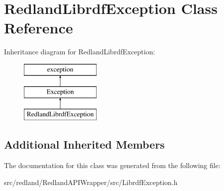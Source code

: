 \hypertarget{classRedlandLibrdfException}{}\section{Redland\+Librdf\+Exception Class Reference}
\label{classRedlandLibrdfException}
Inheritance diagram for Redland\+Librdf\+Exception\+:\begin{figure}[H]
\begin{center}
\leavevmode
\includegraphics[height=3.000000cm]{classRedlandLibrdfException}
\end{center}
\end{figure}
\subsection*{Additional Inherited Members}


The documentation for this class was generated from the following file\+:\begin{DoxyCompactItemize}
\item 
src/redland/\+Redland\+A\+P\+I\+Wrapper/src/Librdf\+Exception.\+h\end{DoxyCompactItemize}
